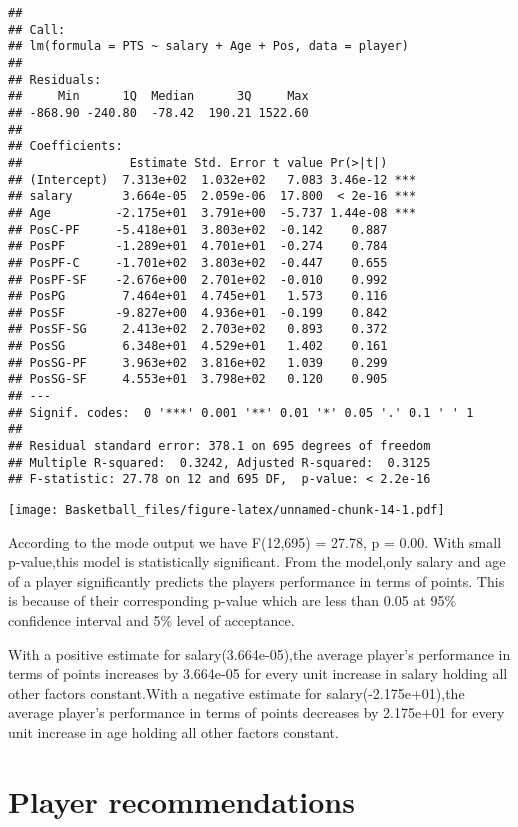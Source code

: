 \documentclass[
]{article}
\begin{document}
\begin{verbatim}
## 
## Call:
## lm(formula = PTS ~ salary + Age + Pos, data = player)
## 
## Residuals:
##     Min      1Q  Median      3Q     Max 
## -868.90 -240.80  -78.42  190.21 1522.60 
## 
## Coefficients:
##               Estimate Std. Error t value Pr(>|t|)    
## (Intercept)  7.313e+02  1.032e+02   7.083 3.46e-12 ***
## salary       3.664e-05  2.059e-06  17.800  < 2e-16 ***
## Age         -2.175e+01  3.791e+00  -5.737 1.44e-08 ***
## PosC-PF     -5.418e+01  3.803e+02  -0.142    0.887    
## PosPF       -1.289e+01  4.701e+01  -0.274    0.784    
## PosPF-C     -1.701e+02  3.803e+02  -0.447    0.655    
## PosPF-SF    -2.676e+00  2.701e+02  -0.010    0.992    
## PosPG        7.464e+01  4.745e+01   1.573    0.116    
## PosSF       -9.827e+00  4.936e+01  -0.199    0.842    
## PosSF-SG     2.413e+02  2.703e+02   0.893    0.372    
## PosSG        6.348e+01  4.529e+01   1.402    0.161    
## PosSG-PF     3.963e+02  3.816e+02   1.039    0.299    
## PosSG-SF     4.553e+01  3.798e+02   0.120    0.905    
## ---
## Signif. codes:  0 '***' 0.001 '**' 0.01 '*' 0.05 '.' 0.1 ' ' 1
## 
## Residual standard error: 378.1 on 695 degrees of freedom
## Multiple R-squared:  0.3242, Adjusted R-squared:  0.3125 
## F-statistic: 27.78 on 12 and 695 DF,  p-value: < 2.2e-16
\end{verbatim}

\texttt{[image: Basketball\_files/figure-latex/unnamed-chunk-14-1.pdf]}

According to the mode output we have F(12,695) = 27.78, p = 0.00. With
small p-value,this model is statistically significant. From the
model,only salary and age of a player significantly predicts the players
performance in terms of points. This is because of their corresponding
p-value which are less than 0.05 at 95\% confidence interval and 5\%
level of acceptance.

With a positive estimate for salary(3.664e-05),the average player's
performance in terms of points increases by 3.664e-05 for every unit
increase in salary holding all other factors constant.With a negative
estimate for salary(-2.175e+01),the average player's performance in
terms of points decreases by 2.175e+01 for every unit increase in age
holding all other factors constant.

\hypertarget{player-recommendations}{%
\section{Player recommendations}\label{player-recommendations}}
\end{document}
